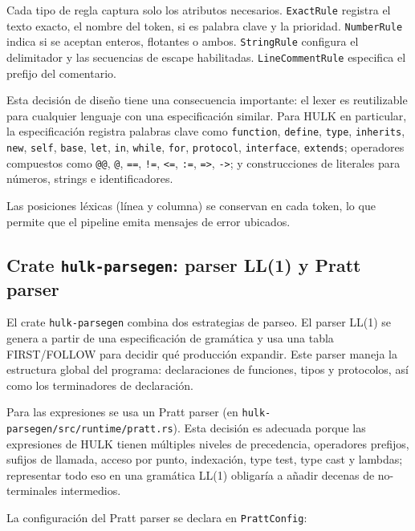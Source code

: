 \documentclass[12pt,letterpaper]{article}
\newcommand{\hulk}{\textsc{HULK}}
\newcommand{\src}[1]{\texttt{#1}}
\begin{document}
Cada tipo de regla captura solo los atributos necesarios. \src{ExactRule} registra el texto exacto, el nombre del token, si es palabra clave y la prioridad. \src{NumberRule} indica si se aceptan enteros, flotantes o ambos. \src{StringRule} configura el delimitador y las secuencias de escape habilitadas. \src{LineCommentRule} especifica el prefijo del comentario.

Esta decisión de diseño tiene una consecuencia importante: el lexer es reutilizable para cualquier lenguaje con una especificación similar. Para \hulk{} en particular, la especificación registra palabras clave como \src{function}, \src{define}, \src{type}, \src{inherits}, \src{new}, \src{self}, \src{base}, \src{let}, \src{in}, \src{while}, \src{for}, \src{protocol}, \src{interface}, \src{extends}; operadores compuestos como \src{@@}, \src{@}, \src{==}, \src{!=}, \src{<=}, \src{:=}, \src{=>}, \src{->}; y construcciones de literales para números, strings e identificadores.

Las posiciones léxicas (línea y columna) se conservan en cada token, lo que permite que el pipeline emita mensajes de error ubicados.

\subsection{Crate \src{hulk-parsegen}: parser LL(1) y Pratt parser}

El crate \src{hulk-parsegen} combina dos estrategias de parseo. El parser LL(1) se genera a partir de una especificación de gramática y usa una tabla \mbox{FIRST/FOLLOW} para decidir qué producción expandir. Este parser maneja la estructura global del programa: declaraciones de funciones, tipos y protocolos, así como los terminadores de declaración.

Para las expresiones se usa un Pratt parser (en \src{hulk-parsegen/src/runtime/pratt.rs}). Esta decisión es adecuada porque las expresiones de \hulk{} tienen múltiples niveles de precedencia, operadores prefijos, sufijos de llamada, acceso por punto, indexación, type test, type cast y lambdas; representar todo eso en una gramática LL(1) obligaría a añadir decenas de no-terminales intermedios.

La configuración del Pratt parser se declara en \src{PrattConfig}:
\end{document}

